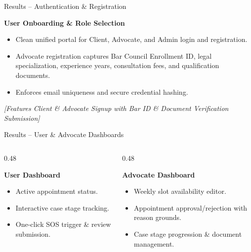 \documentclass[10pt,aspectratio=169]{beamer}
\begin{document}
\begin{frame}{Results -- Authentication \& Registration}
  \begin{block}{\textbf{User Onboarding \& Role Selection}}
    \begin{itemize}
      \item Clean unified portal for Client, Advocate, and Admin login and registration.
      \item Advocate registration captures Bar Council Enrollment ID, legal specialization, experience years, consultation fees, and qualification documents.
      \item Enforces email uniqueness and secure credential hashing.
    \end{itemize}
  \end{block}
  \begin{center}
    \small \textit{[Features Client \& Advocate Signup with Bar ID \& Document Verification Submission]}
  \end{center}
\end{frame}

\begin{frame}{Results -- User \& Advocate Dashboards}
  \begin{columns}[T]
    \begin{column}{0.48\textwidth}
      \begin{block}{\textbf{User Dashboard}}
        \begin{itemize}
          \item Active appointment status.
          \item Interactive case stage tracking.
          \item One-click SOS trigger & review submission.
        \end{itemize}
      \end{block}
    \end{column}

    \begin{column}{0.48\textwidth}
      \begin{block}{\textbf{Advocate Dashboard}}
        \begin{itemize}
          \item Weekly slot availability editor.
          \item Appointment approval/rejection with reason grounds.
          \item Case stage progression & document management.
        \end{itemize}
      \end{block}
    \end{column}
  \end{columns}
\end{frame}
\end{document}
